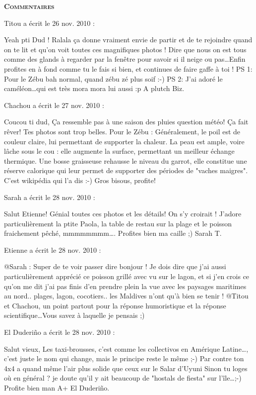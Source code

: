\bigskip
\textbf{\textsc{Commentaires}}

\medskip
Titou a écrit le 26 nov. 2010 :
\begin{displayquote}
Yeah pti Dud !
Ralala ça donne vraiment envie de partir et de te rejoindre quand on te lit et qu'on voit toutes ces magnifiques photos !
Dire que nous on est tous comme des glands à regarder par la fenêtre pour savoir si il neige ou pas\dots Enfin profites en à fond comme tu le fais si bien, et continues de faire gaffe à toi !
PS 1: Pour le Zébu bah normal, quand zébu zé plus soif :-)
PS 2: J'ai adoré le caméléon\dots qui est très mora mora lui aussi :p
A plutch
Biz.
\end{displayquote}

\medskip
Chachou a écrit le 27 nov. 2010 :
\begin{displayquote}
Coucou ti dud,
Ça ressemble pas à une saison des pluies question météo! Ça fait rêver! Tes photos sont trop belles.
Pour le Zébu : Généralement, le poil est de couleur claire, lui permettant de supporter la chaleur. La peau est ample, voire lâche sous le cou : elle augmente la surface, permettant un meilleur échange thermique.
Une bosse graisseuse rehausse le niveau du garrot, elle constitue une réserve calorique qui leur permet de supporter des périodes de "vaches maigres". C'est wikipédia qui l'a dis :-)
Gros bisous, profite!
\end{displayquote}

\medskip
Sarah a écrit le 28 nov. 2010 :
\begin{displayquote}
Salut Etienne!
Génial toutes ces photos et les détails!
On s'y croirait !
J'adore particulièrement la ptite Paola, la table de restau sur la plage et le poisson fraichement pêché, mmmmmmmm\dots.
Profites bien ma caille ;)
Sarah T.
\end{displayquote}

\medskip
Etienne a écrit le 28 nov. 2010 :
\begin{displayquote}
@Sarah : Super de te voir passer dire bonjour ! Je dois dire que j'ai aussi particulièrement apprécié ce poisson grillé avec vu sur le lagon, et si j'en crois ce qu'on me dit j'ai pas finis d'en prendre plein la vue avec les paysages maritimes au nord.. plages, lagon, cocotiers.. les Maldives n'ont qu'à bien se tenir !
@Titou et Chachou, un point partout pour la réponse humoristique et la réponse scientifique\dots Vous savez à laquelle je pensais ;)
\end{displayquote}

\medskip
El Duderiño a écrit le 28 nov. 2010 :
\begin{displayquote}
Salut vieux,
Les taxi-brousses, c'est comme les collectivos en Amérique Latine\dots, c'est juste le nom qui change, mais le principe reste le même ;-)
Par contre ton 4x4 a quand même l'air plus solide que ceux sur le Salar d'Uyuni
Sinon tu loges où en général ? je doute qu'il y ait beaucoup de "hostals de fiesta" sur l'île\dots ;-)
Profite bien man
A+
El Duderiño.
\end{displayquote}

